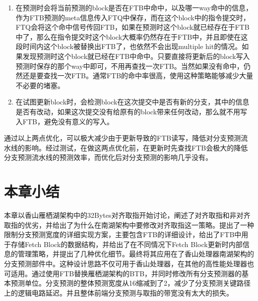\begin{enumerate}
	\item 在预测时会将当前预测的block是否在FTB中命中，以及哪一way命中的信息，作为FTB预测的meta信息传入FTQ中保存，而在这个block中的指令提交时，FTQ会将这个命中信号传回FTB，如果在预测时这个block就已经存在于FTB中了，那么在指令提交时这个block大概率仍然存在于FTB中，并且即使在这段时间内这个block被替换出FTB了，也依然不会出现multiple hit的情况。如果发现预测时这个block就已经在FTB中命中。只要直接将更新后的block写入预测时保存的那个way中即可，不用再查找一次FTB。当然如果没有命中，仍然还是要查找一次FTB。通常FTB的命中率很高，使用这种策略能够减少大量不必要的堵塞。
	\item 在试图更新block时，会检测block在这次提交中是否有新的分支，其中的信息是否有改动，如果这次提交没有给原有的block带来任何改动，那么就不用写入FTB，避免没有意义的写入。
\end{enumerate}

通过以上两点优化，可以极大减少由于更新导致的FTB读写，降低对分支预测流水线的影响。经过测试，在做这两点优化前，在更新时先查找FTB会极大的降低分支预测流水线的预测效率，而优化后对分支预测的影响几乎没有。


\section{本章小结}

本章以香山雁栖湖架构中的32Bytes对齐取指开始讨论，阐述了对齐取指和非对齐取指的优劣，并给出了为什么在南湖架构中要修改对齐取指这一策略。提出了一种限制分支预测宽度的详细实现方案，主要包含FTB的详细设计，给出了FTB中用于存储Fetch Block的数据结构，并给出了在不同情况下Fetch Block更新时内部信息的管理策略，并提出了几种优化细节。最终将其应用在了香山处理器南湖架构的分支预测部件中。这种设计思路不仅可用于香山处理器，在其他的高性能处理器也可适用。通过使用FTB替换雁栖湖架构的BTB，并同时修改所有分支预测器的基本预测单位。分支预测的整体预测宽度从16缩减到了2，减少了分支预测关键路径上的逻辑电路延迟。并且整体前端分支预测与取指的带宽没有太大的损失。
